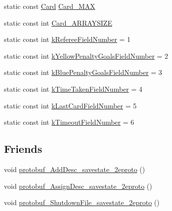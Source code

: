 \begin{DoxyCompactItemize}
\item 
static const \hyperlink{savestate_8pb_8h_a3d0d776b2483d298617cad1c15956ec7}{Card} \hyperlink{class_save_state_ac6958bff2bc49eac49f8ec5adf1801d7}{Card\-\_\-\-M\-A\-X}
\item 
static const int \hyperlink{class_save_state_a31127722479705d6093311c6e3957cf5}{Card\-\_\-\-A\-R\-R\-A\-Y\-S\-I\-Z\-E}
\item 
static const int \hyperlink{class_save_state_a261b18f42fc68c50597b15bb4b1fa51d}{k\-Referee\-Field\-Number} = 1
\item 
static const int \hyperlink{class_save_state_aa4c464e8a710304b588306149aeeba68}{k\-Yellow\-Penalty\-Goals\-Field\-Number} = 2
\item 
static const int \hyperlink{class_save_state_adb90bc94a38a09d43029e70c871c3451}{k\-Blue\-Penalty\-Goals\-Field\-Number} = 3
\item 
static const int \hyperlink{class_save_state_aaa0caf19183208fb4c02c01a245e3793}{k\-Time\-Taken\-Field\-Number} = 4
\item 
static const int \hyperlink{class_save_state_af5458dd12394b9c7319a20c709b30f9b}{k\-Last\-Card\-Field\-Number} = 5
\item 
static const int \hyperlink{class_save_state_a076c51325563ffdfdf35a02b947a88a7}{k\-Timeout\-Field\-Number} = 6
\end{DoxyCompactItemize}
\subsection*{Friends}
\begin{DoxyCompactItemize}
\item 
void \hyperlink{class_save_state_a6c158c382b70217710599263699c97b8}{protobuf\-\_\-\-Add\-Desc\-\_\-savestate\-\_\-2eproto} ()
\item 
void \hyperlink{class_save_state_ad76d2b61ce7efa59b3fa8cc9a2e22804}{protobuf\-\_\-\-Assign\-Desc\-\_\-savestate\-\_\-2eproto} ()
\item 
void \hyperlink{class_save_state_a1ecf56abe5c72689d00559c47c8e69f7}{protobuf\-\_\-\-Shutdown\-File\-\_\-savestate\-\_\-2eproto} ()
\end{DoxyCompactItemize}


